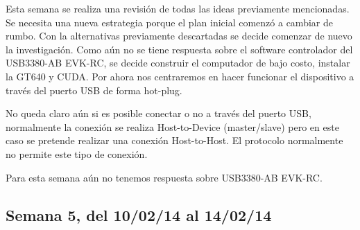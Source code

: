 \documentclass[11pt,oneside,titlepage]{article}
\begin{document}
Esta semana se realiza una revisión de todas las ideas previamente mencionadas. Se necesita una nueva estrategia porque el plan inicial comenzó a cambiar de rumbo. Con la alternativas previamente descartadas se decide comenzar de nuevo la investigación. Como aún no se tiene respuesta sobre el software controlador del USB3380-AB EVK-RC, se decide construir el computador de bajo costo, instalar la GT640 y CUDA. Por ahora nos centraremos en hacer funcionar el dispositivo a través del puerto USB de forma hot-plug. 

No queda claro aún si es posible conectar o no a través del puerto USB, normalmente la conexión se realiza Host-to-Device (master/slave) pero en este caso se pretende realizar una conexión Host-to-Host. El protocolo normalmente no permite este tipo de conexión.

Para esta semana aún no tenemos respuesta sobre USB3380-AB EVK-RC.

\subsection*{Semana 5, del 10/02/14 al 14/02/14}
\begin{comment}

Se realiza una reunión para analizar el estado del proyecto, tres nuevas ideas surgen. Primero, seguir insistiendo por el  USB3380-AB EVK-RC ya que en el mejor de los casos podríamos conectar la GT640 y que la reconozca como dispositivo externo. Segundo, en el caso de que se necesite desarrollar un driver completo para la tarjeta GT640, ponernos en conctacto con los desarrolladores del controlador libre de NVIDIA para la plataforma Linux y ver la posibilidad de utilizar parte de este driver para conectar la tarjeta. Tercero, en caso de no poder conectar 

lunes
- Ademas se realizó un estudio sobre como conectar el comptuador de una forma
plug and play, las opciones son utilizar el puerto Ethernet o, mejor aún,
realizar la conexión a trav\'es USB.

martes 
- Reunion con el profesor para ver el estado del proyecto. 3 ideas
  nuevas aparecieron.

miercoles 
- Contacto con un desarrollador de USB3380 para solicitar ayuda en el
  campo. 
- Estudio de RNDIS para conectar usb a usb, existe la posibilidad.

jueves 
- Estudio del funcionamiento de usb. Aprendi que podemos utilizar el
  computador como gadget y realizar la configuración recompilando el kernel y
  agregando los drivers.Mas detalles leer Linux Gadget Drivers
- Aún falta el cable. 
- Compilación del kernel para agregar los módulos. Estamos a la espera
  del cable USB macho macho.

viernes 
- Update del proyecto al profesor Claudio torres. 
 - compramos cable USB 3.0, estamos a la espera del envío.
\end{comment}
\end{document}

